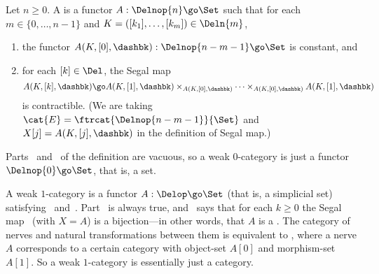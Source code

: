 
Let $n\geq 0$.  A  is a functor $A: \Delnop{n} \go
\Set$ such that for each $m\in \{0, \ldots, n-1\}$ and $K=([k_1], \ldots,
[k_m]) \in \Deln{m}$,
%
\begin{enumerate}
\item 	\label{part:defn:degen-Si}
the functor
$
A(K, [0], \dashbk): \Delnop{n-m-1} \go \Set
$ 
is constant, and
\item 	\label{part:defn:main-Si} 
for each $[k]\in\Del$, the Segal map
\[
A(K, [k], \dashbk) \go 
A(K, [1],\dashbk) \times_{A(K, [0],\dashbk)} \cdots 
\times_{A(K, [0],\dashbk)} A(K, [1],\dashbk)
\]
is contractible.  (We are taking
$\cat{E}=\ftrcat{\Delnop{n-m-1}}{\Set}$ and $X[j]=A(K,[j],\dashbk)$ in the
definition of Segal map.)
\end{enumerate}
%




\clearpage




Parts~ and~ of the
definition are vacuous, so a weak $0$-category is just a functor
$\Delnop{0}\go\Set$, that is, a set.



A weak $1$-category is a functor $A: \Delop \go \Set$ (that is, a simplicial
set) satisfying~ and~.
Part~ is always true, and~
says that for each $k\geq 0$ the Segal map~ (with $X=A$) is
a bijection---in other words, that $A$ is a .  The category of
nerves and natural transformations between them is equivalent to \Cat, where
a nerve $A$ corresponds to a certain category with object-set $A[0]$ and
morphism-set $A[1]$.  So a weak $1$-category is essentially just a category.



